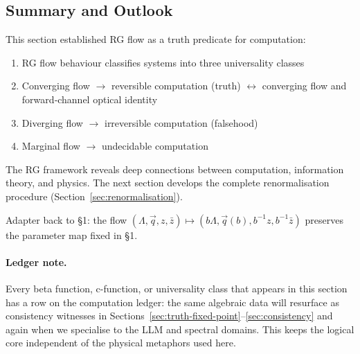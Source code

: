 \subsection{Summary and Outlook}

This section established RG flow as a truth predicate for computation:

\begin{enumerate}
\item RG flow behaviour classifies systems into three universality classes
\item Converging flow $\to$ reversible computation (truth) $\leftrightarrow$ converging flow and forward‑channel optical identity
\item Diverging flow $\to$ irreversible computation (falsehood)  
\item Marginal flow $\to$ undecidable computation
\end{enumerate}

The RG framework reveals deep connections between computation, information theory, and physics. The next section develops the complete renormalisation procedure (Section~\ref{sec:renormalisation}).

Adapter back to §1: the flow $(\Lambda,\vec{q},z,\bar{z})\mapsto (b\Lambda,\vec{q}(b),b^{-1}z,b^{-1}\bar{z})$ preserves the parameter map fixed in §1.

\paragraph{Ledger note.} Every beta function, c-function, or universality class that appears in this section has a row on the computation ledger: the same algebraic data will resurface as consistency witnesses in Sections~\ref{sec:truth-fixed-point}--\ref{sec:consistency} and again when we specialise to the LLM and spectral domains. This keeps the logical core independent of the physical metaphors used here.
